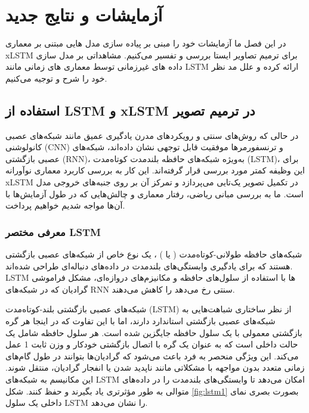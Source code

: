 
\chapter{آزمایشات و نتایج جدید}

در این فصل ما آزمایشات خود را مبنی بر پیاده سازی مدل هایی مبتنی بر معماری xLSTM برای ترمیم تصاویر ایستا بررسی و تفسیر می‌کنیم. مشاهداتی بر مدل سازی داده های غیرزمانی توسط معماری های زمانی مانند LSTM ارائه کرده و علل مد نظر خود را شرح و توجیه می‌کنیم.

\section{استفاده از LSTM و xLSTM در ترمیم تصویر}

در حالی که روش‌های سنتی و رویکردهای مدرن یادگیری عمیق مانند شبکه‌های عصبی کانولوشنی (CNN) و ترنسفورمرها موفقیت قابل توجهی نشان داده‌اند، شبکه‌های عصبی بازگشتی (RNN)، به‌ویژه شبکه‌های حافظه بلندمدت کوتاه‌مدت (LSTM)، برای این وظیفه کمتر مورد بررسی قرار گرفته‌اند. این کار به بررسی کاربرد معماری نوآورانه xLSTM در تکمیل تصویر یک‌تایی می‌پردازد و تمرکز آن بر روی جنبه‌های خروجی مدل است. ما به بررسی مبانی ریاضی، رفتار معماری و چالش‌هایی که در طول آزمایش‌ها با آن‌ها مواجه شدیم خواهیم پرداخت.

\subsection{معرفی مختصر LSTM}
شبکه‌های حافظه طولانی-کوتاه‌مدت ( یا )
\cite{hochreiterLongShortTermMemory1997}
، یک نوع خاص از شبکه‌های عصبی بازگشتی هستند که برای یادگیری وابستگی‌های بلندمدت در داده‌های دنباله‌ای طراحی شده‌اند. LSTM ها با استفاده از سلول‌های حافظه و مکانیزم‌های دروازه‌ای، مشکل فراموشی گرادیان که در شبکه‌های RNN سنتی رخ می‌دهد را کاهش می‌دهند. 

شبکه‌های عصبی بازگشتی بلند-کوتاه‌مدت (LSTM) از نظر ساختاری شباهت‌هایی به شبکه‌های عصبی بازگشتی استاندارد دارند، اما با این تفاوت که در اینجا هر گره بازگشتی معمولی با یک سلول حافظه جایگزین شده است. هر سلول حافظه شامل یک حالت داخلی است که به عنوان یک گره با اتصال بازگشتی خودکار و وزن ثابت 1 عمل می‌کند. این ویژگی منحصر به فرد باعث می‌شود که گرادیان‌ها بتوانند در طول گام‌های زمانی متعدد بدون مواجهه با مشکلاتی مانند ناپدید شدن
یا انفجار
 گرادیان، منتقل شوند. این مکانیسم به شبکه‌های LSTM امکان می‌دهد تا وابستگی‌های بلندمدت را در داده‌های متوالی به طور مؤثرتری یاد بگیرند و حفظ کنند. شکل \ref{fig:lstm1} بصورت بصری نمای داخلی یک سلول LSTM را نشان می‌دهد.

